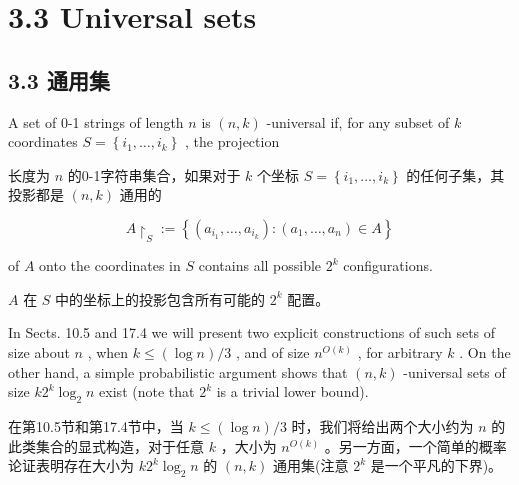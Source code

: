 \documentclass[10pt]{article}
\begin{document}
\section*{3.3 Universal sets}

\begin{tcolorbox}\relax
\section*{3.3 通用集}
\end{tcolorbox}

A set of 0-1 strings of length \(n\) is \(\left( {n,k}\right)\) -universal if, for any subset of \(k\) coordinates \(S = \left\{  {{i}_{1},\ldots ,{i}_{k}}\right\}\) , the projection

\begin{tcolorbox}\relax
长度为 \(n\) 的0-1字符串集合，如果对于 \(k\) 个坐标 \(S = \left\{  {{i}_{1},\ldots ,{i}_{k}}\right\}\) 的任何子集，其投影都是 \(\left( {n,k}\right)\) 通用的
\end{tcolorbox}

\[
A{ \upharpoonright  }_{S} \mathrel{\text{ := }} \left\{  {\left( {{a}_{{i}_{1}},\ldots ,{a}_{{i}_{k}}}\right)  : \left( {{a}_{1},\ldots ,{a}_{n}}\right)  \in  A}\right\}
\]

of \(A\) onto the coordinates in \(S\) contains all possible \({2}^{k}\) configurations.

\begin{tcolorbox}\relax
\(A\) 在 \(S\) 中的坐标上的投影包含所有可能的 \({2}^{k}\) 配置。
\end{tcolorbox}

In Sects. 10.5 and 17.4 we will present two explicit constructions of such sets of size about \(n\) , when \(k \leq  \left( {\log n}\right) /3\) , and of size \({n}^{O\left( k\right) }\) , for arbitrary \(k\) . On the other hand, a simple probabilistic argument shows that \(\left( {n,k}\right)\) -universal sets of size \(k{2}^{k}{\log }_{2}n\) exist (note that \({2}^{k}\) is a trivial lower bound).

\begin{tcolorbox}\relax
在第10.5节和第17.4节中，当 \(k \leq  \left( {\log n}\right) /3\) 时，我们将给出两个大小约为 \(n\) 的此类集合的显式构造，对于任意 \(k\) ，大小为 \({n}^{O\left( k\right) }\) 。另一方面，一个简单的概率论证表明存在大小为 \(k{2}^{k}{\log }_{2}n\) 的 \(\left( {n,k}\right)\) 通用集(注意 \({2}^{k}\) 是一个平凡的下界)。
\end{tcolorbox}
\end{document}
